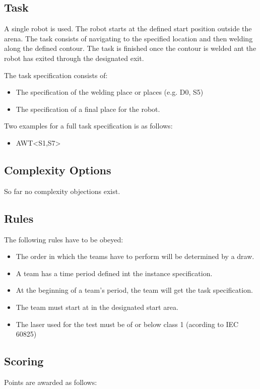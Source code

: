 \subsection{Task}
A single robot is used. The robot starts at the defined start position outside the arena. The task consists of navigating to the specified location and then welding along the defined contour. The task is finished once the contour is welded ant the robot has exited through the designated exit.
\par
The task specification consists of: 
\begin{itemize}
	\item The specification of the welding place or places (e.g. D0, S5)
	\item The specification of a final place for the robot.
\end{itemize}

Two examples for a full task specification is as follows:
\begin{itemize}
	\item AWT\textless S1,S7\textgreater 
\end{itemize}


\subsection{Complexity Options}

So far no complexity objections exist.

\subsection{Rules}
The following rules have to be obeyed:

\begin{itemize}
\item The order in which the teams have to perform will be determined by a draw.
\item A team has a time period defined int the instance specification.
\item At the beginning of a team’s period, the team will get the task specification. 
\item The team must start at in the designated start area.
\item The laser used for the test must be of or below class 1 (acording to IEC 60825)
\end{itemize}


\subsection{Scoring}
Points are awarded as follows:

